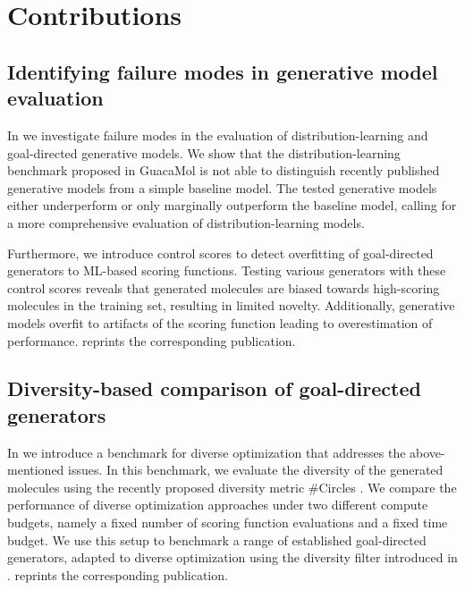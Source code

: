 \section{Contributions\label{sec:contributions}}
\subsection{Identifying failure modes in generative model evaluation}
In \citet{renzFailureModesMolecule2019} we investigate failure modes in the evaluation of
distribution-learning and goal-directed generative models. We show that the distribution-learning
benchmark proposed in GuacaMol \citep{brownGuacaMolBenchmarkingModels2019} is not able to
distinguish recently published generative models from a simple baseline model. The tested generative
models either underperform or only marginally outperform the baseline model, calling for a more
comprehensive evaluation of distribution-learning models.

Furthermore, we introduce control scores to detect overfitting of goal-directed generators to
\ac{ML}-based scoring functions. Testing various generators with these control scores reveals that
generated molecules are biased towards high-scoring molecules in the training set, resulting in
limited novelty. Additionally, generative models overfit to artifacts of the scoring function
leading to overestimation of performance.  reprints the corresponding
publication.

\subsection{Diversity-based comparison of goal-directed generators\label{sec:divopt}} 
In \citet{renzDiverseHitsNovo2024} we introduce a benchmark for diverse optimization that addresses the
above-mentioned issues. In this benchmark, we evaluate the diversity of the generated molecules
using the recently proposed diversity metric \#Circles \citep{xieHowMuchSpace2023}. We compare the
performance of diverse optimization approaches under two different compute budgets, namely a fixed
number of scoring function evaluations and a fixed time budget. We use this setup to benchmark a
range of established goal-directed generators, adapted to diverse optimization using the diversity
filter introduced in \citet{blaschkeMemoryassistedReinforcementLearning2020}.
 reprints the corresponding publication.

